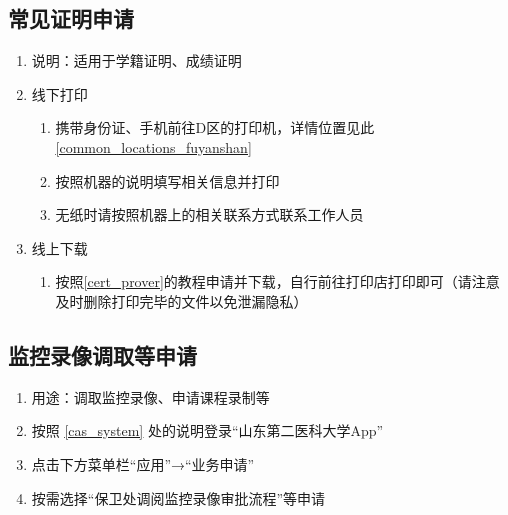 \subsection[常见证明申请]{常见证明申请}
\begin{enumerate}
    \item 说明：适用于学籍证明\footnotemark、成绩证明
    \item 线下打印
          \begin{enumerate}
              \item 携带身份证、手机前往D区的打印机，详情位置见此\uline{\ref{common_locations_fuyanshan}}
              \item 按照机器的说明填写相关信息并打印
              \item 无纸时请按照机器上的相关联系方式联系工作人员
          \end{enumerate}
    \item 线上下载
          \begin{enumerate}
              \item 按照\uline{\ref{cert_prover}}的教程申请并下载，自行前往打印店打印即可（请注意及时删除打印完毕的文件以免泄漏隐私）
          \end{enumerate}
\end{enumerate}

\subsection[监控录像调取等申请]{监控录像调取等申请}
\label{sdsmu_app}
\begin{enumerate}
    \item 用途：调取监控录像、申请课程录制等
    \item 按照 \uline{\ref{cas_system}} 处的说明登录“山东第二医科大学App”
    \item 点击下方菜单栏“应用”→“业务申请”
    \item 按需选择“保卫处调阅监控录像审批流程”等申请
\end{enumerate}

